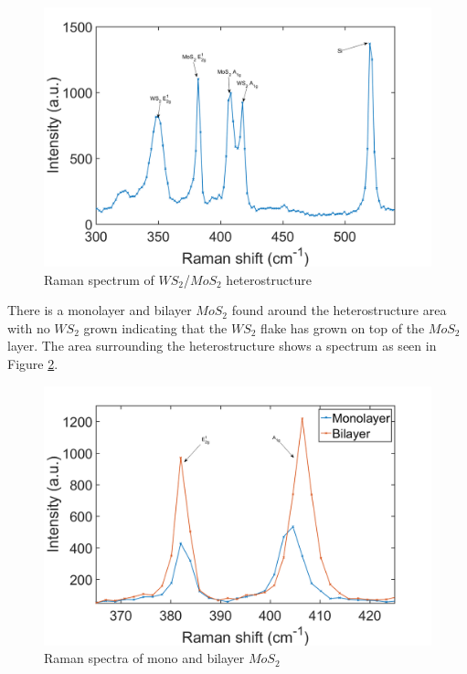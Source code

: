 \begin{figure}[H]
	\begin{center}
		\includegraphics[scale=0.3]{Heterostructures/RamanSpectrum2.png}
		\caption{Raman spectrum of $WS_2$/$MoS_2$ heterostructure}
		\label{fig:HeterostructureRamanSpectrum}
	\end{center}
\end{figure}

There is a monolayer and bilayer $MoS_2$ found around the heterostructure area with no $WS_2$ grown  indicating that the $WS_2$ flake has grown on top of the $MoS_2$ layer. The area surrounding the heterostructure shows a spectrum as seen in Figure \ref{fig:HeterostructuresRamanSpectraMonoBi}. 

\begin{figure}[H]
	\begin{center}
		\includegraphics[scale=0.3]{Heterostructures/RamanSpectraMonoBi2.png}
		\caption{Raman spectra of mono and bilayer $MoS_2$}
		\label{fig:HeterostructuresRamanSpectraMonoBi}
	\end{center}
\end{figure}

